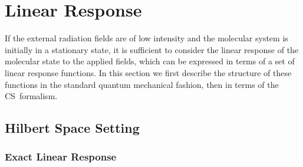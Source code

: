 \documentclass[aps,preprint]{revtex4}%
\begin{document}
\section{Linear Response\label{linres}}

If the external radiation fields are of low intensity and the molecular system
is initially in a stationary state, it is sufficient to consider the linear
response of the molecular state to the applied fields, which can be expressed
in terms of a set of linear response functions. In this section we first
describe the structure of these functions in the standard quantum mechanical
fashion, then in terms of the CS\ formalism.

\subsection{Hilbert Space Setting\label{Hilset}}

\subsubsection{Exact Linear Response\label{exlinres}}
\end{document}
